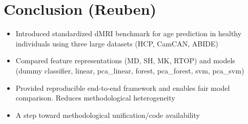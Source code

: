 \section{Conclusion (Reuben)}
\begin{itemize}
    \item Introduced standardized dMRI benchmark for age prediction in healthy individuals using three large datasets (HCP, CamCAN, ABIDE) 
    \item Compared feature representations (MD, SH, MK, RTOP) and models (dummy classifier, linear, pca\_linear, forest, pca\_forest, svm, pca\_svm)
    \item Provided reproducible end{-}to{-}end framework and enables fair model comparison. Reduces methodological heterogeneity
    \item A step toward methodological unification/code availability
\end{itemize}


\newpage
